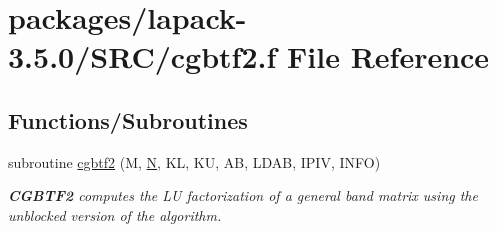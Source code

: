 \hypertarget{cgbtf2_8f}{}\section{packages/lapack-\/3.5.0/\+S\+R\+C/cgbtf2.f File Reference}
\label{cgbtf2_8f}
\subsection*{Functions/\+Subroutines}
\begin{DoxyCompactItemize}
\item 
subroutine \hyperlink{group__complexGBcomputational_ga6172b0b895daff569f8bd4f6b7e8ca21}{cgbtf2} (M, \hyperlink{polmisc_8c_a0240ac851181b84ac374872dc5434ee4}{N}, K\+L, K\+U, A\+B, L\+D\+A\+B, I\+P\+I\+V, I\+N\+F\+O)
\begin{DoxyCompactList}\small\item\em {\bfseries C\+G\+B\+T\+F2} computes the L\+U factorization of a general band matrix using the unblocked version of the algorithm. \end{DoxyCompactList}\end{DoxyCompactItemize}
